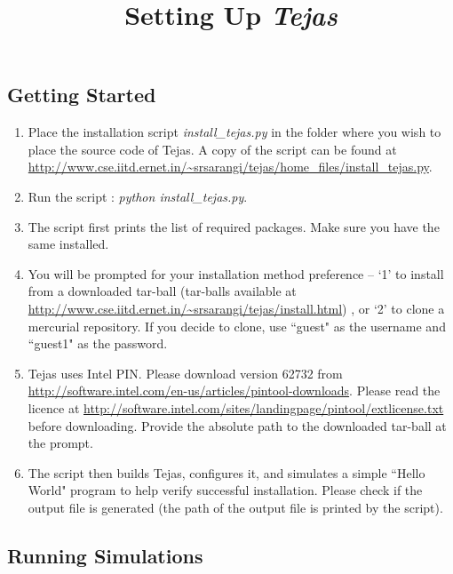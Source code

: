 \documentclass[margin=0.1in]{article}
\begin{document}
\title{Setting Up {\em Tejas}}
\date{}
\maketitle


\subsection*{Getting Started}

\begin{enumerate}

\item
Place the installation script {\em install\_tejas.py} in the folder where you wish to place the source code of Tejas. A copy of the script can be found at \url{http://www.cse.iitd.ernet.in/~srsarangi/tejas/home_files/install_tejas.py}.

\item
Run the script : {\em python install\_tejas.py}.

\item
The script first prints the list of required packages. Make sure you have the same installed.

\item
You will be prompted for your installation method preference -- `1' to 
install from a downloaded tar-ball (tar-balls available at \url{http://www.cse.iitd.ernet.in/~srsarangi/tejas/install.html})
, or `2' to clone a mercurial repository. If you decide to clone,
use ``guest" as the username and ``guest1" as the password.

\item
Tejas uses Intel PIN. Please download version 62732 from \url{http://software.intel.com/en-us/articles/pintool-downloads}.
Please read the licence at \url{http://software.intel.com/sites/landingpage/pintool/extlicense.txt} before downloading.
Provide the absolute path to the downloaded tar-ball at the prompt.

\item
The script then builds Tejas, configures it, and simulates a simple ``Hello World" program
to help verify successful installation. Please check if the output file is generated (the path of the output file is printed by the script).


\end{enumerate}


\subsection*{Running Simulations}
\end{document}
